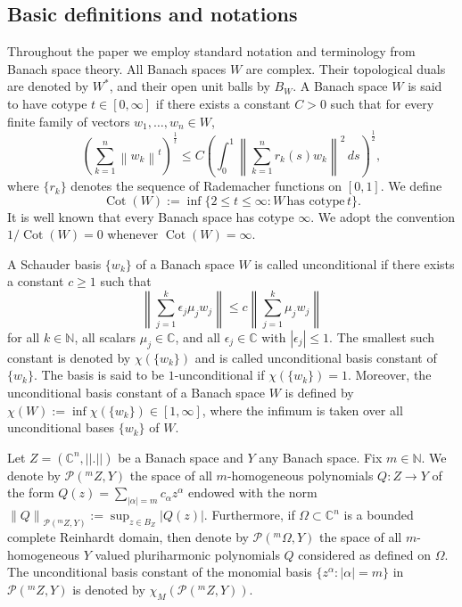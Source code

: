 \documentclass[a4paper,11pt, reqno]{amsart}
\theoremstyle{definition}
\newcounter {own}
\newcommand{\norm}[1]{\left\lVert#1\right\rVert}
\begin{document}
\subsection{Basic definitions and notations}
Throughout the paper we employ standard notation and terminology from Banach space theory. All Banach spaces $W$ are complex. Their topological duals are denoted by $W^{*}$, and their open unit balls by $B_{W}$. A Banach space $W$ is said to have cotype $t\in [0,\infty]$ if there exists a constant $C>0$ such that for every finite family of vectors $w_{1},\ldots,w_{n}\in W$, 
$$\left(\sum_{k=1}^{n}\norm{w_{k}}^t\right)^{\frac{1}{t}} \leq C \left(\int_{0}^{1}\norm{\sum_{k=1}^{n}r_{k}(s)w_{k}}^2\, ds\right)^{\frac{1}{2}},$$
where $\{r_{k}\}$ denotes the sequence of Rademacher functions on $[0,1]$. We define 
$$\operatorname{Cot}(W):=\inf\{2 \leq t \leq \infty: W\, \mbox{has cotype}\, t\}.
$$
It is well known that every Banach space has cotype $\infty$. We adopt the convention $1/\operatorname{Cot}(W)=0$ whenever $\operatorname{Cot}(W)=\infty$. 
\par 
A Schauder basis $\{w_{k}\}$ of a Banach space $W$ is called unconditional if there exists a constant $c\geq 1$ such that $$\norm{\sum_{j=1}^{k}\epsilon_{j}\mu_{j}w_{j}} \leq c \norm{\sum_{j=1}^{k}\mu_{j}w_{j}}
$$
for all $k \in \mathbb{N}$, all scalars $\mu _{j} \in \mathbb{C}$, and all $\epsilon_{j} \in \mathbb{C}$ with $|\epsilon_{j}| \leq 1$.  The smallest such constant is denoted by $\chi(\{w_{k}\})$ and is called unconditional basis constant of $\{w_{k}\}$. The basis is said to be $1$-unconditional if $\chi(\{w_{k}\})=1$. Moreover, the unconditional basis constant of a Banach space $W$ is defined by $\chi(W):=\inf \chi(\{w_{k}\})\in [1,\infty]$, where the infimum is taken over all unconditional bases $\{w_{k}\}$ of $W$. 
\par
Let $Z=(\mathbb{C}^n, ||.||)$ be a Banach space and $Y$ any Banach space. Fix $m \in \mathbb{N}$. We denote by $\mathcal{P}(^m Z,Y)$ the space of all $m$-homogeneous polynomials $Q:Z \rightarrow Y$ of the form $Q(z)=\sum_{|\alpha|=m}c_{\alpha}z^{\alpha}$ endowed with the norm $\norm{Q}_{\mathcal{P}(^m Z,Y)}:=\sup_{z \in B_{Z}}|Q(z)|$. Furthermore, if $\Omega \subset \mathbb{C}^n$ is a bounded complete Reinhardt domain, then denote by $\mathcal{P}(^m \Omega,Y)$ the space of all $m$-homogeneous $Y$ valued pluriharmonic polynomials $Q$ considered as defined on $\Omega$.  The unconditional basis constant of the monomial basis $\{z^{\alpha}: |\alpha|=m\}$ in $\mathcal{P}(^m Z,Y)$ is denoted by $\chi_{M}(\mathcal{P}(^m Z,Y))$.
\end{document}
